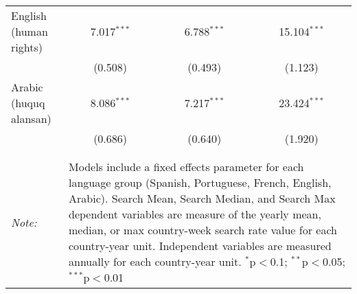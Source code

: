 \begin{table}[!htbp]
\begin{tabular}{@{\extracolsep{5pt}}lccc}
  English (human rights) & 7.017$^{***}$ & 6.788$^{***}$ & 15.104$^{***}$ \\ 
  & (0.508) & (0.493) & (1.123) \\ 
  Arabic (huquq alansan) & 8.086$^{***}$ & 7.217$^{***}$ & 23.424$^{***}$ \\ 
  & (0.686) & (0.640) & (1.920) \\ 
 \hline \\[-1.8ex] 
\hline 
\hline \\[-1.8ex] 
\textit{Note:}  & \multicolumn{3}{l}{\parbox[t]{8cm}{Models include a fixed effects parameter for each language group (Spanish, Portuguese, French, English, Arabic). Search Mean, Search Median, and Search Max dependent variables are measure of the yearly mean, median, or max country-week search rate value for each country-year unit. Independent variables are measured annually for each country-year unit. $^{*}$p$<$0.1; $^{**}$p$<$0.05; $^{***}$p$<$0.01}} \\ 
\end{tabular} 
\end{table} 

